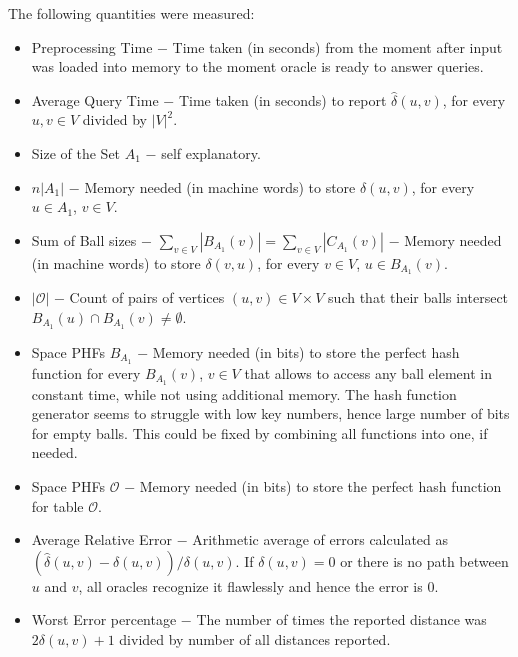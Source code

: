 \documentclass[shortabstract, lic, english]{iithesis}
\theoremstyle{definition} \newtheorem{definition}{Definition}[chapter]
\theoremstyle{plain} \newtheorem{remark}[definition]{Observation}
\theoremstyle{plain} \newtheorem{theorem}[definition]{Theorem}
\theoremstyle{plain} \newtheorem{lemma}[definition]{Lemma}
\theoremstyle{plain} \newtheorem{conjecture}[definition]{Conjecture}
\begin{document}
The following quantities were measured:
\begin{itemize}
    \item Preprocessing Time $-$ Time taken (in seconds) from the moment after input was loaded into memory to the moment oracle is ready to answer queries.
    \item Average Query Time $-$ Time taken (in seconds) to report $\hat{\delta}(u, v)$, for every $u, v \in V$ divided by $|V|^2$.
    \item Size of the Set $A_1$ $-$ self explanatory.
    \item $n|A_1|$ $-$ Memory needed (in machine words) to store $\delta(u, v)$, for every $u \in A_1$, $v \in V$.
    \item Sum of Ball sizes $-$ $\sum_{v \in V} |B_{A_1}(v)| = \sum_{v \in V} |C_{A_1}(v)|$ $-$ Memory needed (in machine words) to store $\delta(v, u)$, for every $v \in V$, $u \in B_{A_1}(v)$.
    \item $|\mathcal{O}|$ $-$ Count of pairs of vertices $(u,v) \in V \times V$ such that their balls intersect $B_{A_1}(u) \cap B_{A_1}(v) \neq \emptyset$.
    \item Space PHFs $B_{A_1}$ $-$ Memory needed (in bits) to store the perfect hash function for every $B_{A_1}(v)$, $v \in V$ that allows to access any ball element in constant time, while not using additional memory. 
            The hash function generator seems to struggle with low key numbers, hence large number of bits for empty balls. This could be fixed by combining all functions into one, if needed.
    \item Space PHFs $\mathcal{O}$  $-$ Memory needed (in bits) to store the perfect hash function for table $\mathcal{O}$.
    \item Average Relative Error $-$ Arithmetic average of errors calculated
            as $(\hat{\delta}(u,v) - \delta(u,v)) / \delta(u,v)$.
            If $\delta(u,v) = 0$ or there is no path between $u$ and $v$, all oracles recognize it flawlessly and hence the error is $0$.
    \item Worst Error percentage $-$ The number of times the reported distance was $2\delta(u, v) + 1$ divided by number of all distances reported.
\end{itemize}
\end{document}
